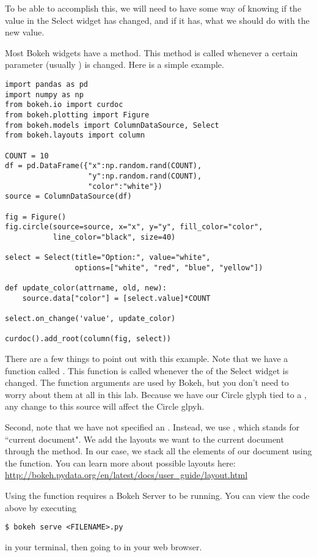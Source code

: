 To be able to accomplish this, we will need to have some way of knowing if the
value in the Select widget has changed, and if it has, what we should do with the
new value.

Most Bokeh widgets have a  method. This method is called whenever
a certain parameter (usually ) is changed. Here is a simple example.

\begin{lstlisting}
import pandas as pd
import numpy as np
from bokeh.io import curdoc
from bokeh.plotting import Figure
from bokeh.models import ColumnDataSource, Select
from bokeh.layouts import column

COUNT = 10
df = pd.DataFrame({"x":np.random.rand(COUNT),
                   "y":np.random.rand(COUNT),
                   "color":"white"})
source = ColumnDataSource(df)

fig = Figure()
fig.circle(source=source, x="x", y="y", fill_color="color",
           line_color="black", size=40)

select = Select(title="Option:", value="white",
                options=["white", "red", "blue", "yellow"])

def update_color(attrname, old, new):
    source.data["color"] = [select.value]*COUNT

select.on_change('value', update_color)

curdoc().add_root(column(fig, select))
\end{lstlisting}

There are a few things to point out with this example. Note that we have a function
called . This function is called whenever the  of
the Select widget is changed. The function arguments 
are used by Bokeh, but you don't need to worry about them at all in this lab.
Because we have our Circle glyph tied to a
, any change to this source will affect the Circle glpyh.

Second, note that we have not specified an . Instead, we use
, which stands for ``current document". We add the layouts we want
to the current document through the  method. In our case, we
stack all the elements of our document using the  function. You can
learn more about possible layouts here:
\url{http://bokeh.pydata.org/en/latest/docs/user_guide/layout.html}

Using the  function requires a Bokeh Server to be running.
You can view the code above by executing
\begin{lstlisting}
$ bokeh serve <FILENAME>.py
\end{lstlisting}
in your terminal, then going to  in your web
browser.

